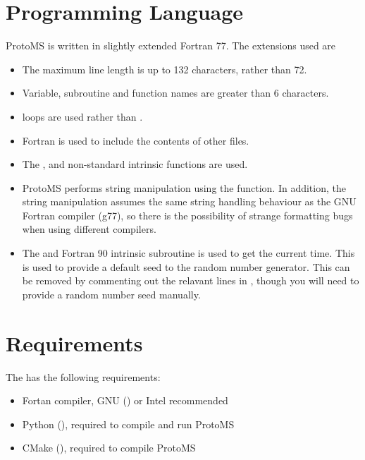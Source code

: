\documentclass[letterpaper,10pt,english]{sphinxmanual}
\begin{document}
\section{Programming Language}
\label{\detokenize{compilation:fortran77}}\label{\detokenize{compilation:programming-language}}
ProtoMS is written in slightly extended Fortran 77. The extensions used are
\begin{itemize}
\item {} 
The maximum line length is up to 132 characters, rather than 72.

\item {} 
Variable, subroutine and function names are greater than 6 characters.

\item {} 
 loops are used rather than .

\item {} 
Fortran  is used to include the contents of other files.

\item {} 
The ,  and  non-standard intrinsic functions are used.

\item {} 
ProtoMS performs string manipulation using the  function. In addition, the string manipulation assumes the same string handling behaviour as the GNU Fortran compiler (g77), so there is the possibility of strange formatting bugs when using different compilers.

\item {} 
The  and  Fortran 90 intrinsic subroutine is used to get the current time. This is used to provide a default seed to the random number generator. This can be removed by commenting out the relavant lines in , though you will need to provide a random number seed manually.

\end{itemize}


\section{Requirements}
\label{\detokenize{compilation:requirements}}
The  has the following requirements:
\begin{itemize}
\item {} 
Fortan compiler, GNU () or Intel recommended

\item {} 
Python (), required to compile and run ProtoMS

\item {} 
CMake (), required to compile ProtoMS

\end{itemize}
\end{document}
